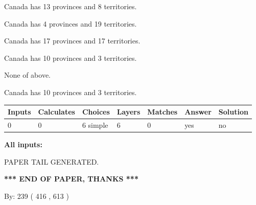 \documentclass[12pt]{article}
\begin{document}
 
Canada has  13 provinces and  8 territories.
 
 
Canada has   4 provinces and  19 territories.
 
 
Canada has  17 provinces and  17 territories.
 
 
Canada has 10  provinces and 3 territories.
 
 
 None of above.
 
 
\noindent{}
 
 
Canada has 10  provinces and 3 territories.
 
 
\noindent{}
 
 
   
   
   
   
\noindent\begin{tabular}{|l|l|l|l|l|l|l|}
 \hline
Inputs & Calculates & Choices & Layers & Matches & Answer & Solution \\ \hline
 0  & 
 0  & 
 6
  simple  
  & 
 6  & 
 0  & 
  yes & 
  no 
  \\ \hline
 \end{tabular}
   
   
   
   
\noindent{}
   
   
   
   
\noindent\vspace{0.1in}\hspace{-0.08in} {\textbf{\Large{All inputs: }}}
   
   
   
   
   
   
 \vspace{0.2in}
 
   
   
\vspace{2.0in} PAPER TAIL GENERATED.
   
   
   
   
\vspace{1.0in} 
{\textbf{\large{ *** END OF PAPER, THANKS *** }}} 
   
   
\hspace{1.0in} By: 
 239 ( 416 ,  613 )
   
\end{document}
